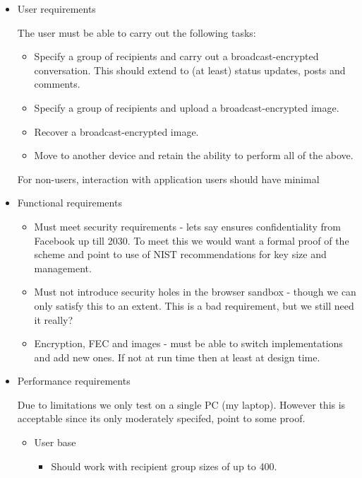     \begin{itemize}
    
        \item User requirements
        
        The user must be able to carry out the following tasks:
        \begin{itemize}
            \item Specify a group of recipients and carry out a broadcast-encrypted conversation. This should extend to (at least) status updates, posts and comments.
            \item Specify a group of recipients and upload a broadcast-encrypted image.
            \item Recover a broadcast-encrypted image.
            \item Move to another device and retain the ability to perform all of the above.
        \end{itemize}
        
        For non-users, interaction with application users should have minimal 
        
        \item Functional requirements
        
        \begin{itemize}
            \item Must meet security requirements - lets say ensures confidentiality from Facebook up till 2030. To meet this we would want a formal proof of the scheme and point to use of NIST recommendations for key size and management.
            \item Must not introduce security holes in the browser sandbox - though we can only satisfy this to an extent. This is a bad requirement, but we still need it really?
            \item Encryption, FEC and images - must be able to switch implementations and add new ones. If not at run time then at least at design time.
        \end{itemize}
            
        \item Performance requirements
        
        Due to limitations we only test on a single PC (my laptop). However this is acceptable since its only moderately specifed, point to some proof.
        
        \begin{itemize}
        
            \item User base
            \begin{itemize}
                \item Should work with recipient group sizes of up to 400.
            \end{itemize}
            

\end{itemize}
\end{itemize}
